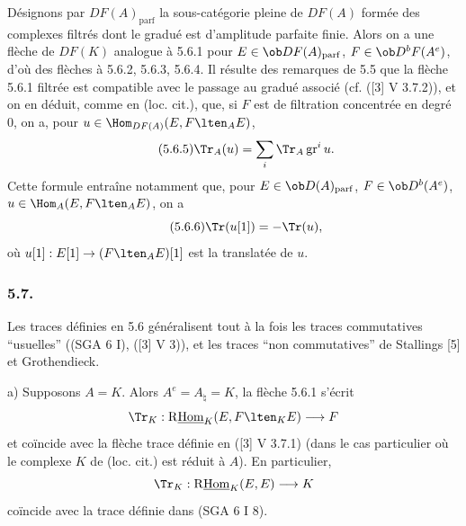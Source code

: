 Désignons par $DF(A)_{\mathrm{parf}}$ la sous-catégorie pleine de $DF(A)$ formée des complexes filtrés dont le gradué est d'amplitude parfaite finie. Alors on a une flèche de $DF(K)$ analogue à 5.6.1 pour $E\in\ob DF(A)_{\mathrm{parf}}$, $F\in\ob D^bF(A^e)$, d'où des flèches  à 5.6.2, 5.6.3, 5.6.4. Il résulte des remarques de 5.5 que la flèche 5.6.1 filtrée est compatible avec le passage au gradué associé (cf. ([3] V 3.7.2)), et on en déduit, comme en (loc. cit.), que, si $F$ est de filtration concentrée en degré $0$, on a, pour $u\in\Hom_{DF(A)}(E,F\lten_AE)$,
\begin{equation}\tag{5.6.5}
\Tr_A(u)=\sum_i\Tr_A\operatorname{gr}^i u.
\end{equation}
Cette formule entraîne notamment que, pour $E\in\ob D(A)_{\mathrm{parf}}$, $F\in\ob D^b(A^e)$, $u\in\Hom_A(E,F\lten_AE)$, on a
\begin{equation}\tag{5.6.6}
\Tr(u[1])=-\Tr(u),
\end{equation}
où $u[1]:E[1]\to(F\lten_AE)[1]$ est la translatée de $u$.

\subsubsection*{5.7.}

Les traces définies en 5.6 généralisent tout à la fois les traces commutatives ``usuelles'' ((SGA 6 I), ([3] V 3)), et les traces ``non commutatives'' de Stallings [5] et Grothendieck.

a) Supposons $A=K$. Alors $A^e=A_\natural=K$, la flèche 5.6.1 s'écrit
\[
\Tr_K:\mathrm{R}\underline{\mathrm{Hom}}_K(E,F\lten_KE)\longrightarrow F
\]
et
coïncide avec la flèche trace définie en ([3] V 3.7.1) (dans le cas particulier où le complexe $K$ de (loc. cit.) est réduit à $A$). En particulier,
\[
\Tr_K:\mathrm{R}\underline{\mathrm{Hom}}_K(E,E)\longrightarrow K
\]
coïncide avec la trace définie dans (SGA 6 I 8).

